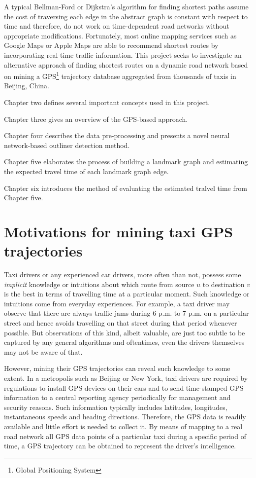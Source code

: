 A typical Bellman-Ford\cite{CLRS09} or Dijkstra's algorithm\cite{Dij59} for finding shortest paths assume the cost of traversing each edge in the abstract graph is constant with respect to time and therefore, do not work on time-de\-pendent road networks without appropriate modifications. Fortunately, most online mapping services such as Google Maps or Apple Maps are able to recommend shortest routes by incorporating real-time traffic information. This project seeks to investigate an alternative approach of finding shortest routes on a dynamic road network based on mining a GPS\footnote{Global Positioning System} trajectory database aggregated from thousands of taxis in Beijing, China.

Chapter two defines several important concepts used in this project. 

Chapter three gives an overview of the GPS-based approach.

Chapter four describes the data pre-processing and presents a novel neural network-based outliner detection method.

Chapter five elaborates the process of building a landmark graph and estimating the expected travel time of each landmark graph edge.

Chapter six introduces the method of evaluating the estimated tralvel time from Chapter five.

\section{Motivations for mining taxi GPS trajectories}
Taxi drivers or any experienced car drivers, more often than not, possess some \emph{implicit} knowledge or intuitions about which route from source $u$ to destination $v$ is the best in terms of travelling time at a particular moment. Such knowledge or intuitions come from everyday experiences. For example, a taxi driver may observe that there are always traffic jams during 6 p.m. to 7 p.m. on a particular street and hence avoids travelling on that street during that period whenever possible. But observations of this kind, albeit valuable, are just too subtle to be captured by any general algorithms and oftentimes, even the drivers themselves may not be aware of that.

However, mining their GPS trajectories can reveal such knowledge to some extent. In a metropolis such as Beijing or New York, taxi drivers are required by regulations to install GPS devices on their cars and to send time-stamped GPS information to a central reporting agency periodically for management and security reasons. Such information typically includes latitudes, longitudes, instantaneous speeds and heading directions. Therefore, the GPS data is readily available and little effort is needed to collect it. By means of mapping to a real road network all GPS data points of a particular taxi during a specific period of time, a GPS trajectory can be obtained to represent the driver's intelligence. 

